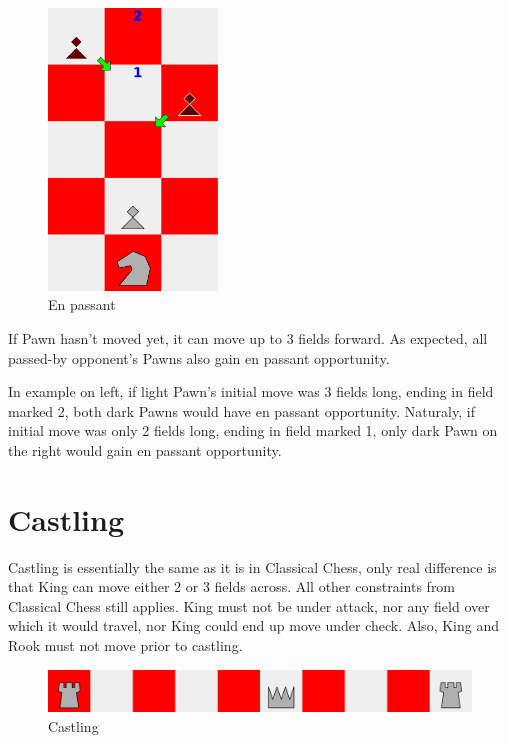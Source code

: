 \documentclass[a5paper,12pt,draft]{book} %
\begin{document}
\noindent
\begin{figure}
\includegraphics[width=0.4\textwidth, keepaspectratio=true]{../gfx/en_passants/04_croatian_ties_en_passant.png}
\caption{En passant}
\label{fig:cc_en_passant}
\end{figure}
\indent
If Pawn hasn't moved yet, it can move up to 3 fields forward. As expected, all passed-by
opponent's Pawns also gain en passant opportunity.

In example on left, if light Pawn's
initial move was 3 fields long, ending in field marked 2, both dark Pawns would have en
passant opportunity. Naturaly, if initial move was only 2 fields long, ending in field
marked 1, only dark Pawn on the right would gain en passant opportunity.

\clearpage

\section*{Castling}

\indent
Castling is essentially the same as it is in Classical Chess, only real difference is that
King can move either 2 or 3 fields across. All other constraints from Classical Chess still
applies. King must not be under attack, nor any field over which it would travel, nor King
could end up move under check. Also, King and Rook must not move prior to castling.

\noindent
\begin{figure}[!h]
\includegraphics[width=1.0\textwidth, keepaspectratio=true]{../gfx/castlings/04_croatian_ties_castling.png}
\caption{Castling}
\label{fig:cc_castling}
\end{figure}
\end{document}
